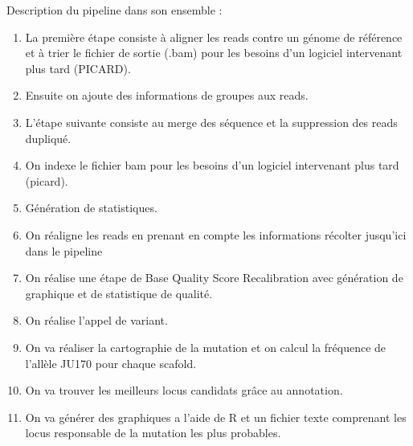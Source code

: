 \documentclass[12pt]{article}
\begin{document}
Description du pipeline dans son ensemble :
\begin{enumerate}



\item La première étape consiste à aligner les reads contre un génome de référence et à trier le fichier de sortie (.bam) pour les besoins d'un logiciel intervenant plus tard (PICARD). 
\item Ensuite on ajoute des informations de groupes aux reads.
\item L'étape suivante consiste au merge des séquence et la suppression des reads dupliqué. 
\item On indexe le fichier bam pour les besoins d'un logiciel intervenant plus tard (picard). 
\item Génération de statistiques.
\item On réaligne les reads en prenant en compte les informations récolter jusqu'ici dans le pipeline
\item On réalise une étape de Base Quality Score Recalibration avec génération de graphique et de statistique de qualité.
\item On réalise l'appel de variant. 
\item On va réaliser la cartographie de la mutation et on calcul la fréquence de l'allèle JU170 pour chaque scafold. 
\item On va trouver les meilleurs locus candidats grâce au annotation. 
\item On va générer des graphiques a l'aide de R et un fichier texte comprenant les locus responsable de la mutation les plus probables. 
\end{enumerate}
\end{document}

